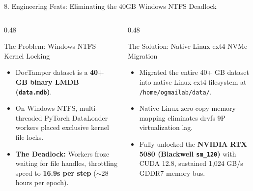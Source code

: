 \documentclass[aspectratio=169, 10pt]{beamer}
\begin{document}
\begin{frame}{8. Engineering Feats: Eliminating the 40GB Windows NTFS Deadlock}
  \begin{columns}[T]
    \begin{column}{0.48\textwidth}
      \begin{alertbox}{The Problem: Windows NTFS Kernel Locking}
        \begin{itemize}\small
          \item DocTamper dataset is a \textbf{40+ GB binary LMDB (\texttt{data.mdb})}.
          \item On Windows NTFS, multi-threaded PyTorch DataLoader workers placed exclusive kernel file locks.
          \item \textbf{The Deadlock:} Workers froze waiting for file handles, throttling speed to \textbf{16.9s per step} ($\sim 28$ hours per epoch).
        \end{itemize}
      \end{alertbox}
    \end{column}

    \begin{column}{0.48\textwidth}
      \begin{successbox}{The Solution: Native Linux ext4 NVMe Migration}
        \begin{itemize}\small
          \item Migrated the entire 40+ GB dataset into native Linux ext4 filesystem at \texttt{/home/ogmailab/data/}.
          \item Native Linux zero-copy memory mapping eliminates drvfs 9P virtualization lag.
          \item Fully unlocked the \textbf{NVIDIA RTX 5080 (Blackwell \texttt{sm\_120})} with CUDA 12.8, sustained 1,024 GB/s GDDR7 memory bus.
        \end{itemize}
      \end{successbox}
    \end{column}
  \end{columns}
\end{frame}
\end{document}
